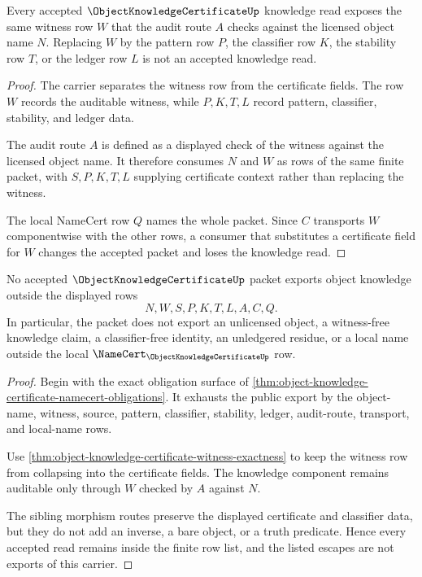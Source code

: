 \begin{theorem}
\label{thm:object-knowledge-certificate-witness-exactness}
Every accepted $\ObjectKnowledgeCertificateUp$ knowledge read exposes the same witness row $W$ that the audit route $A$ checks against the licensed object name $N$. Replacing $W$ by the pattern row $P$, the classifier row $K$, the stability row $T$, or the ledger row $L$ is not an accepted knowledge read.
\end{theorem}
\begin{proof}
The carrier separates the witness row from the certificate fields. The row $W$ records the auditable witness, while $P,K,T,L$ record pattern, classifier, stability, and ledger data.

The audit route $A$ is defined as a displayed check of the witness against the licensed object name. It therefore consumes $N$ and $W$ as rows of the same finite packet, with $S,P,K,T,L$ supplying certificate context rather than replacing the witness.

The local NameCert row $Q$ names the whole packet. Since $C$ transports $W$ componentwise with the other rows, a consumer that substitutes a certificate field for $W$ changes the accepted packet and loses the knowledge read.
\end{proof}

\begin{theorem}
\label{thm:object-knowledge-certificate-nonescape}
No accepted $\ObjectKnowledgeCertificateUp$ packet exports object knowledge outside the displayed rows
$$
N,W,S,P,K,T,L,A,C,Q.
$$
In particular, the packet does not export an unlicensed object, a witness-free knowledge claim, a classifier-free identity, an unledgered residue, or a local name outside the local $\NameCert_{\ObjectKnowledgeCertificateUp}$ row.
\end{theorem}
\begin{proof}
Begin with the exact obligation surface of \autoref{thm:object-knowledge-certificate-namecert-obligations}. It exhausts the public export by the object-name, witness, source, pattern, classifier, stability, ledger, audit-route, transport, and local-name rows.

Use \autoref{thm:object-knowledge-certificate-witness-exactness} to keep the witness row from collapsing into the certificate fields. The knowledge component remains auditable only through $W$ checked by $A$ against $N$.

The sibling morphism routes preserve the displayed certificate and classifier data, but they do not add an inverse, a bare object, or a truth predicate. Hence every accepted read remains inside the finite row list, and the listed escapes are not exports of this carrier.
\end{proof}

